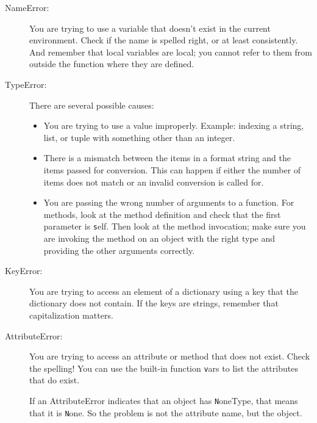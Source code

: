 \documentclass[
DIV=11,
fontsize=13,
twoside,
headinclude=false,
titlepage=firstiscover,
abstract=true,
headsepline=true,
footsepline=true,
chapterprefix=true, %
headings=big,
bibliography=totoc,%
captions=tableheading
]{scrbook}
\theoremstyle{definition}
\begin{document}
\begin{description}

\item[NameError:]  You are trying to use a variable that doesn't
exist in the current environment.  Check if the name
is spelled right, or at least consistently.
And remember that local variables are local; you
cannot refer to them from outside the function where they are defined.

\item[TypeError:] There are several possible causes:

\begin{itemize}

\item  You are trying to use a value improperly.  Example: indexing
a string, list, or tuple with something other than an integer.

\item There is a mismatch between the items in a format string and
the items passed for conversion.  This can happen if either the number
of items does not match or an invalid conversion is called for.

\item You are passing the wrong number of arguments to a function.
For methods, look at the method definition and
check that the first parameter is {\texttt self}.  Then look at the
method invocation; make sure you are invoking the method on an
object with the right type and providing the other arguments
correctly.

\end{itemize}

\item[KeyError:]  You are trying to access an element of a dictionary
using a key that the dictionary does not contain.  If the keys
are strings, remember that capitalization matters.

\item[AttributeError:] You are trying to access an attribute or method
  that does not exist.  Check the spelling!  You can use the built-in
  function {\texttt vars} to list the attributes that do exist.

If an AttributeError indicates that an object has {\texttt NoneType},
that means that it is {\texttt None}.  So the problem is not the
attribute name, but the object.


\end{description}
\end{document}
